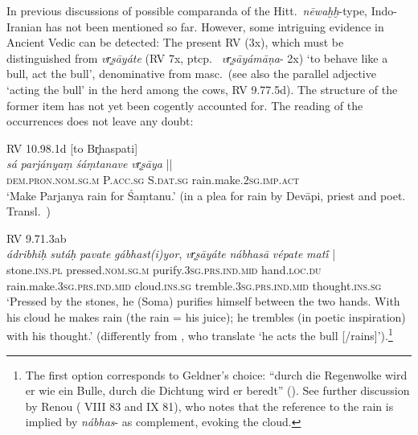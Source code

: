 \documentclass[output=paper,colorlinks,citecolor=brown]{langscibook}
\begin{document}
In previous discussions of possible comparanda of the Hitt.\ \textit{nēwaḫḫ}-type, Indo-Iranian has not been mentioned so far. However, some intriguing evidence in Ancient Vedic can be detected: The present RV   (3x), which must be distinguished from  \textit{vr̥ṣāyáte} (RV 7x, ptcp.\  \textit{vr̥ṣāyámāṇa}- 2x) ‘to behave like a bull, act the bull’, denominative  from  masc.\ (see also the parallel adjective  ‘acting the bull’ in the herd among the cows, RV 9.77.5d). The structure of the former item has not yet been cogently accounted for. The reading of the occurrences does not leave any doubt: 

\begin{exe}
    \ex RV 10.98.1d [to Br̥haspati]\\
    \gll \textit{sá} \textit{parjányaṃ} \textit{śáṃtanave} {\textit{vr̥ṣāya}  ||}\\
    \textsc{dem.pron.nom.sg.m} P.\textsc{acc.sg} S.\textsc{dat.sg} rain.make.\textsc{2sg.imp.act}\\
    \glt `Make Parjanya rain for Śaṃtanu.' (in a plea for rain by Devāpi, priest and poet. Transl.\ \citealt[1555]{JamisonBrereton2014})
\end{exe}

\begin{exe}
    \ex RV 9.71.3ab\\ \gll \textit{ádribhiḥ} \textit{sutáḥ} \textit{pavate} \textit{gábhast(i)yor}, {\textit{vr̥ṣāyáte} } \textit{nábhasā} \textit{vépate} {\textit{matī́} |} \\
    stone.\textsc{ins.pl} pressed.\textsc{nom.sg.m} purify.\textsc{3sg.prs.ind.mid} hand.\textsc{loc.du} rain.make.\textsc{3sg.prs.ind.mid} cloud.\textsc{ins.sg} tremble.\textsc{3sg.prs.ind.mid} thought.\textsc{ins.sg} \\
    \glt `Pressed by the stones, he (Soma) purifies himself between the two hands. With his cloud he makes rain (the rain = his juice); he trembles (in poetic inspiration) with his thought.' (differently from \citealt[1304]{JamisonBrereton2014}, who translate ‘he acts the bull [/rains]’).\footnote{The first option corresponds to Geldner’s choice: “durch die Regenwolke wird er wie ein Bulle, durch die Dichtung wird er beredt” (\citealt[III, 63]{GeldnerRV}). See further discussion by Renou ( VIII 83 and IX 81), who notes that the reference to the rain is implied by \textit{nábhas}- as complement, evoking the cloud.} 
\end{exe}
\end{document}
